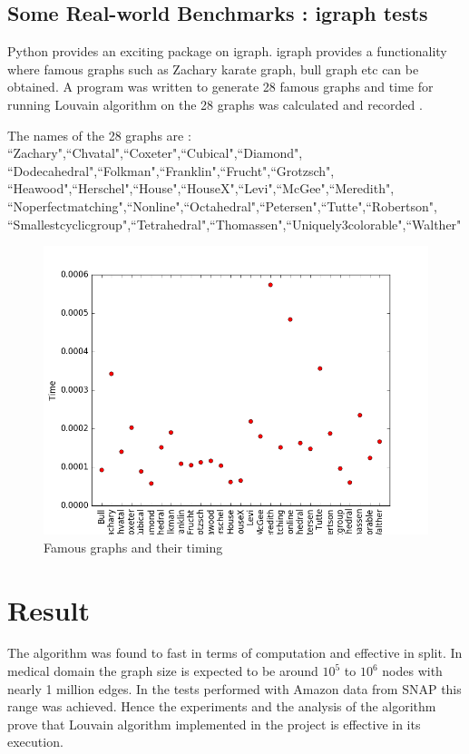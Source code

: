 \subsection{Some Real-world Benchmarks : igraph tests}
Python provides an exciting package on igraph. igraph provides a functionality where famous graphs such as Zachary karate graph, bull graph etc can be obtained. A program was written to generate 28 famous graphs and time for running Louvain algorithm on the 28 graphs was calculated and recorded \cite{igraph}. 
\par The names of the 28 graphs are : 
\\``Zachary",``Chvatal",``Coxeter",``Cubical",``Diamond",\\
``Dodecahedral",``Folkman",``Franklin",``Frucht",``Grotzsch",\\
``Heawood",``Herschel",``House",``HouseX",``Levi",``McGee",``Meredith",\\
``Noperfectmatching",``Nonline",``Octahedral",``Petersen",``Tutte",``Robertson",\\
``Smallestcyclicgroup",``Tetrahedral",``Thomassen",``Uniquely3colorable",``Walther"\\

\begin{figure}[H]
\centering
\includegraphics[scale=0.3]{fam.png}
\caption{Famous graphs and their timing}
\end{figure}

\section{Result}
The algorithm was found to fast in terms of computation and effective in split. In medical domain the graph size is expected to be around $10^5$ to $10^6$ nodes with nearly 1 million edges. In the tests performed with Amazon data from SNAP this range was achieved. Hence the experiments and the analysis of the algorithm prove that Louvain algorithm implemented in the project is effective in its execution.

